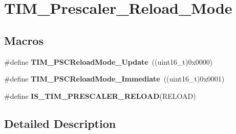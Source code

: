 \hypertarget{group___t_i_m___prescaler___reload___mode}{\section{T\-I\-M\-\_\-\-Prescaler\-\_\-\-Reload\-\_\-\-Mode}
\label{group___t_i_m___prescaler___reload___mode}
}
\subsection*{Macros}
\begin{DoxyCompactItemize}
\item 
\hypertarget{group___t_i_m___prescaler___reload___mode_gad76dd05a3ae4e44e040e0e083bd460bf}{\#define {\bfseries T\-I\-M\-\_\-\-P\-S\-C\-Reload\-Mode\-\_\-\-Update}~((uint16\-\_\-t)0x0000)}\label{group___t_i_m___prescaler___reload___mode_gad76dd05a3ae4e44e040e0e083bd460bf}

\item 
\hypertarget{group___t_i_m___prescaler___reload___mode_ga9ba55481ccdcb64268b7b9f2095bfc17}{\#define {\bfseries T\-I\-M\-\_\-\-P\-S\-C\-Reload\-Mode\-\_\-\-Immediate}~((uint16\-\_\-t)0x0001)}\label{group___t_i_m___prescaler___reload___mode_ga9ba55481ccdcb64268b7b9f2095bfc17}

\item 
\#define {\bfseries I\-S\-\_\-\-T\-I\-M\-\_\-\-P\-R\-E\-S\-C\-A\-L\-E\-R\-\_\-\-R\-E\-L\-O\-A\-D}(R\-E\-L\-O\-A\-D)
\end{DoxyCompactItemize}


\subsection{Detailed Description}


